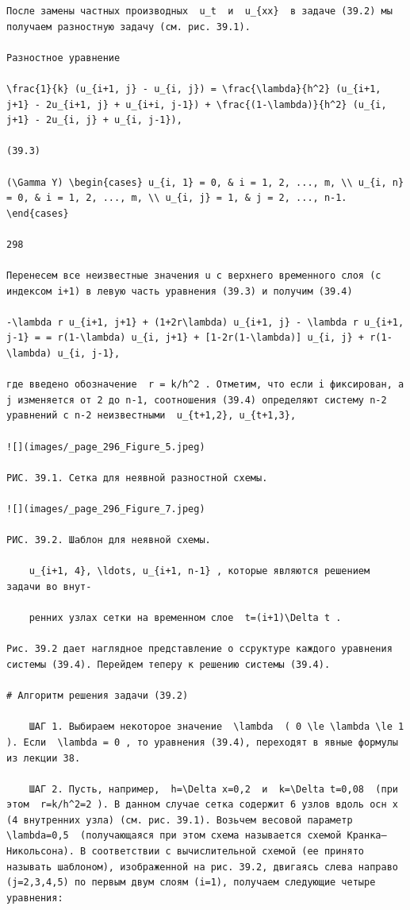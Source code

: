 \documentclass[
  ukrainian,
]{article}
\begin{document}
\begin{verbatim}
После замены частных производных  u_t  и  u_{xx}  в задаче (39.2) мы получаем разностную задачу (см. рис. 39.1).

Разностное уравнение

\frac{1}{k} (u_{i+1, j} - u_{i, j}) = \frac{\lambda}{h^2} (u_{i+1, j+1} - 2u_{i+1, j} + u_{i+i, j-1}) + \frac{(1-\lambda)}{h^2} (u_{i, j+1} - 2u_{i, j} + u_{i, j-1}),

(39.3)

(\Gamma Y) \begin{cases} u_{i, 1} = 0, & i = 1, 2, ..., m, \\ u_{i, n} = 0, & i = 1, 2, ..., m, \\ u_{i, j} = 1, & j = 2, ..., n-1. \end{cases}

298

Перенесем все неизвестные значения u с верхнего временного слоя (с индексом i+1) в левую часть уравнения (39.3) и получим (39.4)

-\lambda r u_{i+1, j+1} + (1+2r\lambda) u_{i+1, j} - \lambda r u_{i+1, j-1} = = r(1-\lambda) u_{i, j+1} + [1-2r(1-\lambda)] u_{i, j} + r(1-\lambda) u_{i, j-1},

где введено обозначение  r = k/h^2 . Отметим, что если i фиксирован, а j изменяется от 2 до n-1, соотношения (39.4) определяют систему n-2 уравнений с n-2 неизвестными  u_{t+1,2}, u_{t+1,3},

![](images/_page_296_Figure_5.jpeg)

РИС. 39.1. Сетка для неявной разностной схемы.

![](images/_page_296_Figure_7.jpeg)

РИС. 39.2. Шаблон для неявной схемы.

    u_{i+1, 4}, \ldots, u_{i+1, n-1} , которые являются решением задачи во внут-

    ренних узлах сетки на временном слое  t=(i+1)\Delta t .

Рис. 39.2 дает наглядное представление о ссруктуре каждого уравнения системы (39.4). Перейдем теперу к решению системы (39.4).

# Алгоритм решения задачи (39.2)

    ШАГ 1. Выбираем некоторое значение  \lambda  ( 0 \le \lambda \le 1 ). Если  \lambda = 0 , то уравнения (39.4), переходят в явные формулы из лекции 38.

    ШАГ 2. Пусть, например,  h=\Delta x=0,2  и  k=\Delta t=0,08  (при этом  r=k/h^2=2 ). В данном случае сетка содержит 6 узлов вдоль осн x (4 внутренних узла) (см. рис. 39.1). Возьчем весовой параметр  \lambda=0,5  (получающаяся при этом схема называется схемой Кранка—Никольсона). В соответствии с вычислительной схемой (ее принято называть шаблоном), изображенной на рис. 39.2, двигаясь слева направо (j=2,3,4,5) по первым двум слоям (i=1), получаем следующие четыре уравнения:


\end{verbatim}
\end{document}
